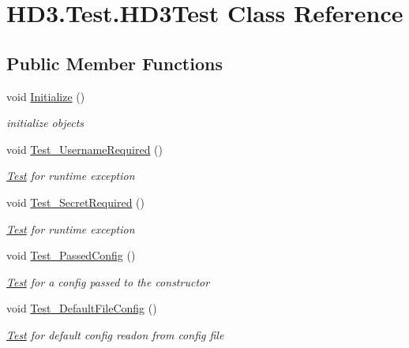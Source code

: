 \hypertarget{class_h_d3_1_1_test_1_1_h_d3_test}{\section{H\+D3.\+Test.\+H\+D3\+Test Class Reference}
\label{class_h_d3_1_1_test_1_1_h_d3_test}
}
\subsection*{Public Member Functions}
\begin{DoxyCompactItemize}
\item 
void \hyperlink{class_h_d3_1_1_test_1_1_h_d3_test_ae9e28970c4958a3e32fcb32f8138c450}{Initialize} ()
\begin{DoxyCompactList}\small\item\em initialize objects \end{DoxyCompactList}\item 
void \hyperlink{class_h_d3_1_1_test_1_1_h_d3_test_acd440d651771abea6c4f7bec066b8fc9}{Test\+\_\+\+Username\+Required} ()
\begin{DoxyCompactList}\small\item\em \hyperlink{namespace_h_d3_1_1_test}{Test} for runtime exception \end{DoxyCompactList}\item 
void \hyperlink{class_h_d3_1_1_test_1_1_h_d3_test_a6e43154f24d0068475a0dccdd27ed0b1}{Test\+\_\+\+Secret\+Required} ()
\begin{DoxyCompactList}\small\item\em \hyperlink{namespace_h_d3_1_1_test}{Test} for runtime exception \end{DoxyCompactList}\item 
void \hyperlink{class_h_d3_1_1_test_1_1_h_d3_test_a6164a00d42c805f748af17e88cde7f96}{Test\+\_\+\+Passed\+Config} ()
\begin{DoxyCompactList}\small\item\em \hyperlink{namespace_h_d3_1_1_test}{Test} for a config passed to the constructor \end{DoxyCompactList}\item 
void \hyperlink{class_h_d3_1_1_test_1_1_h_d3_test_a5c2635c61ef62aef235f1c3013b5118a}{Test\+\_\+\+Default\+File\+Config} ()
\begin{DoxyCompactList}\small\item\em \hyperlink{namespace_h_d3_1_1_test}{Test} for default config readon from config file \end{DoxyCompactList}\item 

\end{DoxyCompactItemize}

